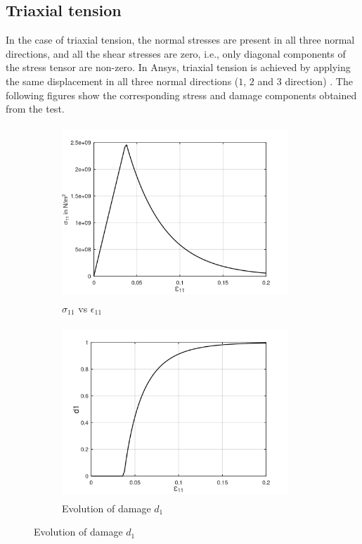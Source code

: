 \documentclass[12pt,a4paper,twoside,openright]{report}
\begin{document}
\subsection{Triaxial tension}
\indent\indent\indent In the case of triaxial tension, the normal stresses are present in all three normal directions, and all the shear stresses are zero, i.e., only diagonal components of the stress tensor are non-zero.  In Ansys, triaxial tension is achieved by applying the same displacement in all three normal directions ($1$, $2$ and $3$ direction) \citep{ubt}. The following figures show the corresponding stress and damage components obtained from the test.\\

\begin{figure}[htbp!]
       \captionsetup[subfigure]{justification=centering}
     \begin{subfigure}{0.4\textwidth}
         \includegraphics[width=8.5cm,height=6.5cm]{24.S11vsE11.png}
         \caption{$\sigma_{11}$ vs $\epsilon_{11}$}
         \label{fig:S11vsE11 2}
     \end{subfigure}
     \hspace{1.5cm}
     \captionsetup[subfigure]{justification=centering}
     \begin{subfigure}{0.4\textwidth}
         \includegraphics[width=8.5cm,height=6.5cm]{24.d1.png}
         \caption{Evolution of damage $d_{1}$}
         \label{fig:Evolution of damage d1 2}
     \end{subfigure}
\end{figure}
\end{document}
